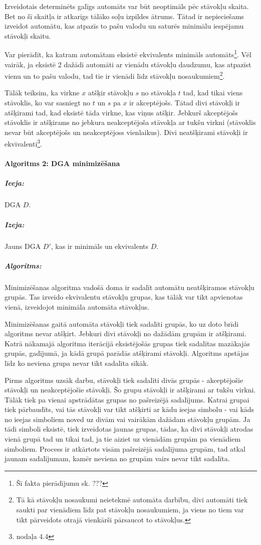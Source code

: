Izveidotais determinēts galīgs automāts var būt neoptimāls pēc stāvokļu skaita. Bet no šī skaitļa ir atkarīgs tālāko soļu izpildes ātrums. Tātad ir nepieciešams izveidot automātu, kas atpazīs to pašu valodu un saturēs minimālu iespējamu stāvokļi skaitu.

Var pierādīt, ka katram automātam eksistē ekvivalents minimāls automāts\footnote{Šī fakta pierādījumu sk. ???}. Vēl vairāk, ja eksistē 2 dažādi automāti ar vienādu stāvokļu daudzumu, kas atpazīst vienu un to pašu valodu, tad tie ir vienādi līdz stāvokļu nosaukumiem\footnote{Tā kā stāvokļu nosaukumi neietekmē automāta darbību, divi automāti tiek saukti par vienādiem līdz pat stāvokļu nosaukumiem, ja viens no tiem var tikt pārveidots otrajā vienkārši pārsaucot to stāvokļus.}.

Tālāk teiksim, ka virkne $x$ atšķir stāvokļu $s$ no stāvokļa $t$ tad, kad tikai viens stāvoklis, ko var sasniegt no $t$ un $s$ pa $x$ ir akceptējošs. Tātad divi stāvokļi ir atšķirami tad, kad eksistē tāda virkne, kas viņus atšķir. Jebkurš akceptējošs stāvoklis ir atšķirams no jebkura neakceptējoša stāvokļa ar tukšu virkni (stāvoklis nevar būt akceptējošs un neakceptējoss vienlaikus). Divi neatšķirami stāvokļi ir ekvivalenti\footnote{\cite{Hopcroft:IntroAutomataTheory} nodaļa 4.4}.

\paragraph*{Algoritms 2: DGA minimizēšana}
\subparagraph{Ieeja:}DGA $D$.
\subparagraph{Izeja:}Jauns DGA $D'$, kas ir minimāls un ekvivalents $D$.
\subparagraph{Algoritms:} 

Minimizēšanas algoritma vadošā doma ir sadalīt automātu neatšķiramos stāvokļu grupās. Tas izveido ekvivalentu stāvokļu grupas, kas tālāk var tikt apvienotas vienā, izveidojot minimāla automāta stāvokļus.

Minimizēšanas gaitā automāta stāvokļi tiek sadalīti grupās, ko uz doto brīdi algoritms nevar atšķirt. Jebkuri divi stāvokļi no dažādām grupām ir atšķirami. Katrā nākamajā algoritma iterācijā eksistējošās grupas tiek sadalītas mazākajās grupās, gadījumā, ja kādā grupā parādās atšķirami stāvokļi. Algoritms apstājas līdz ko neviena grupa nevar tikt sadalīta sīkāk.

Pirms algoritms uzsāk darbu, stāvokļi tiek sadalīti divās grupās - akceptējošie stāvokļi un neakceptējošie stāvokļi. Šo grupu stāvokļi ir atšķirami ar tukšu virkni. Tālāk tiek pa vienai apstrādātas grupas no pašreizējā sadalījums. Katrai grupai tiek pārbaudīts, vai tās stāvokļi var tikt atšķirti ar kādu ieejas simbolu - vai kāds no ieejas simboliem noved uz divām vai vairākām dažādam stāvokļu grupām. Ja tādi simboli eksistē, tiek izveidotas jaunas grupas, tādas, ka divi stāvokļi atrodas vienā grupā tad un tikai tad, ja tie aiziet uz vienādām grupām pa vienādiem simboliem. Process ir atkārtots visām pašreizējā sadalījuma grupām, tad atkal jaunam sadalījumam, kamēr neviena no grupām vairs nevar tikt sadalīta.


